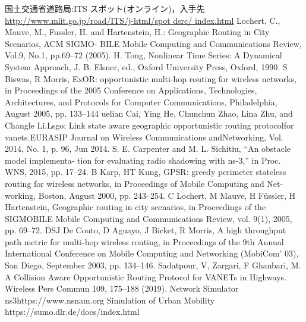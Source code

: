 \documentclass[technicalreport]{ieicej}
\begin{document}
\begin{thebibliography}{99}

	国土交通省道路局:ITS スポット(オンライン)，入手先
\url{http://www.mlit.go.jp/road/ITS/j-html/spot dsrc/ index.html}
Lochert, C., Mauve, M., Fussler, H. and Hartenstein, H.: Geographic Routing in City Scenarios, ACM SIGMO- BILE Mobile Computing and Communications Review, Vol.9, No.1, pp.69–72 (2005).
	H. Tong, Nonlinear Time Series: A Dynamical System Approach, J. B. Elsner, ed., Oxford University Press, Oxford, 1990.
	S Biswas, R Morris, ExOR: opportunistic multi-hop routing for wireless networks, in Proceedings of the 2005 Conference on Applications, Technologies, Architectures, and Protocols for Computer Communications, Philadelphia, August 2005, pp. 133–144 
 	uelian Cai, Ying He, Chunchun Zhao, Lina Zhu, and Changle Li.Lsgo: Link state aware geographic opportunistic routing protocolfor vanets.EURASIP Journal on Wireless Communications andNetworking, Vol. 2014, No. 1, p. 96, Jun 2014.
 	S. E. Carpenter and M. L. Sichitiu, “An obstacle model implementa- tion for evaluating radio shadowing with ns-3,” in Proc. WNS, 2015, pp. 17–24.
 	B Karp, HT Kung, GPSR: greedy perimeter stateless routing for wireless networks, in Proceedings of Mobile Computing and Net-working, Boston, August 2000, pp. 243–254.
	C Lochert, M Mauve, H Füssler, H Hartenstein, Geographic routing in city scenarios, in Proceedings of the SIGMOBILE Mobile Computing and Communications Review, vol. 9(1), 2005, pp. 69–72.
 DSJ De Couto, D Aguayo, J Bicket, R Morris, A high throughput path metric for multi-hop wireless routing, in Proceedings of the 9th Annual International Conference on Mobile Computing and Networking (MobiCom’ 03), San Diego, September 2003, pp. 134–146.
Sadatpour, V, Zargari, F Ghanbari, M. A Collision Aware Opportunistic Routing Protocol for VANETs in Highways. Wireless Pers Commun 109, 175–188 (2019).
 Network Simulator ns3https://www.nsnam.org
 Simulation of Urban Mobility https://sumo.dlr.de/docs/index.html 
\end{thebibliography}
\end{document}
